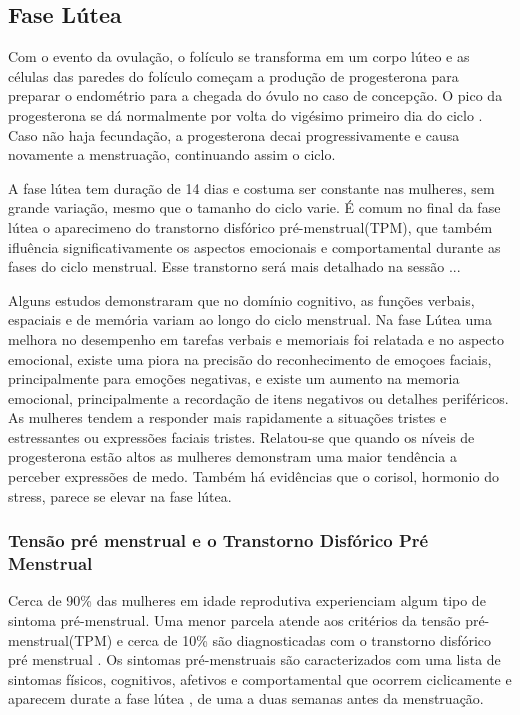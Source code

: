 \subsection{Fase Lútea}

Com o evento da ovulação, o folículo se transforma em um corpo lúteo e as células das paredes do folículo começam a produção de progesterona para preparar o endométrio para a chegada do óvulo no caso de concepção. O pico da progesterona se dá normalmente por volta do vigésimo primeiro dia do ciclo \cite{nikas2003}. Caso não haja fecundação, a progesterona decai progressivamente e causa novamente a menstruação, continuando assim o ciclo.

A fase lútea tem duração de 14 dias e costuma ser constante nas mulheres, sem grande variação, mesmo que o tamanho do ciclo varie. É comum no final da fase lútea o aparecimeno do transtorno disfórico pré-menstrual(TPM), que também ifluência significativamente os aspectos emocionais e comportamental durante as fases do ciclo menstrual. Esse transtorno será mais detalhado na sessão ...

Alguns estudos demonstraram que no domínio cognitivo, as funções verbais, espaciais e de memória variam ao longo do ciclo menstrual. Na fase Lútea uma melhora no desempenho em tarefas verbais e memoriais foi relatada \cite{hausmann2000} e no aspecto emocional, existe uma piora na precisão do reconhecimento de emoçoes faciais, principalmente para emoções negativas, e existe um aumento na memoria emocional, principalmente a recordação de itens negativos ou detalhes periféricos. As mulheres tendem a responder mais rapidamente a situações tristes e estressantes ou expressões faciais tristes. Relatou-se que quando os níveis de progesterona estão altos as mulheres demonstram uma maior tendência a perceber expressões de medo. Também há evidências que o corisol, hormonio do stress, parece se elevar na fase lútea\cite{kirschbaum1999}.

\subsubsection{Tensão pré menstrual e o Transtorno Disfórico Pré Menstrual}

Cerca de 90\% das mulheres em idade reprodutiva experienciam algum tipo de sintoma pré-menstrual. Uma menor parcela atende aos critérios da tensão pré-menstrual(TPM) e cerca de 10\% são diagnosticadas com o transtorno disfórico pré menstrual \cite{mishell2005}. Os sintomas pré-menstruais são caracterizados com uma lista de sintomas físicos, cognitivos, afetivos e comportamental que ocorrem ciclicamente e aparecem durate a fase lútea \cite{obrien2011}, de uma a duas semanas antes da menstruação. 

